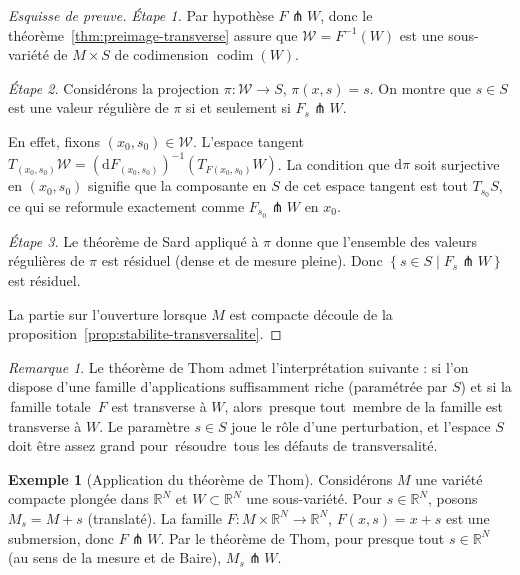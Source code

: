 \documentclass[12pt,a4paper,openany]{book}
\theoremstyle{definition}
\newtheorem{exemple}[definition]{Exemple}
\theoremstyle{plain}
\theoremstyle{remark}
\newtheorem{remarque}[definition]{Remarque}
\newcommand{\R}{\mathbb{R}}
\newcommand{\dd}{\mathrm{d}}
\newcommand{\set}[1]{\left\{#1\right\}}
\providecommand{\og}{\guillemotleft\,}
\providecommand{\fg}{\,\guillemotright}
\begin{document}
\begin{proof}[Esquisse de preuve]
\emph{Étape 1.}
Par hypothèse $F \pitchfork W$, donc le
théorème~\ref{thm:preimage-transverse} assure que
$\mathcal{W} = F^{-1}(W)$ est une sous-variété de $M \times S$
de codimension $\operatorname{codim}(W)$.

\emph{Étape 2.}
Considérons la projection $\pi \colon \mathcal{W} \to S$,
$\pi(x, s) = s$. On montre que $s \in S$ est une valeur régulière
de $\pi$ si et seulement si $F_s \pitchfork W$.

En effet, fixons $(x_0, s_0) \in \mathcal{W}$. L'espace tangent
$T_{(x_0,s_0)}\mathcal{W} = (\dd F_{(x_0,s_0)})^{-1}(T_{F(x_0,s_0)}W)$.
La condition que $\dd\pi$ soit surjective en $(x_0,s_0)$ signifie que la
composante en $S$ de cet espace tangent est tout $T_{s_0}S$, ce qui
se reformule exactement comme $F_{s_0} \pitchfork W$ en $x_0$.

\emph{Étape 3.}
Le théorème de Sard appliqué à $\pi$ donne que
l'ensemble des valeurs régulières de $\pi$ est résiduel (dense et de
mesure pleine). Donc $\set{s \in S \mid F_s \pitchfork W}$ est résiduel.

La partie sur l'ouverture lorsque $M$ est compacte découle de la
proposition~\ref{prop:stabilite-transversalite}.
\end{proof}

\begin{remarque}\label{rem:thom-interpretation}
Le théorème de Thom admet l'interprétation suivante : si l'on dispose
d'une famille d'applications suffisamment riche (paramétrée par $S$)
et si la \og{}famille totale\fg{} $F$ est transverse à $W$, alors
\og{}presque tout\fg{} membre de la famille est transverse à $W$. Le
paramètre $s \in S$ joue le rôle d'une perturbation, et l'espace $S$
doit être assez grand pour \og{}résoudre\fg{} tous les défauts de
transversalité.
\end{remarque}

\begin{exemple}[Application du théorème de Thom]\label{ex:thom-plongements}
Considérons $M$ une variété compacte plongée dans $\R^N$ et
$W \subset \R^N$ une sous-variété. Pour $s \in \R^N$, posons
$M_s = M + s$ (translaté). La famille $F \colon M \times \R^N \to \R^N$,
$F(x, s) = x + s$ est une submersion, donc $F \pitchfork W$. Par le
théorème de Thom, pour presque tout $s \in \R^N$ (au sens de la mesure
et de Baire), $M_s \pitchfork W$.
\end{exemple}
\end{document}
